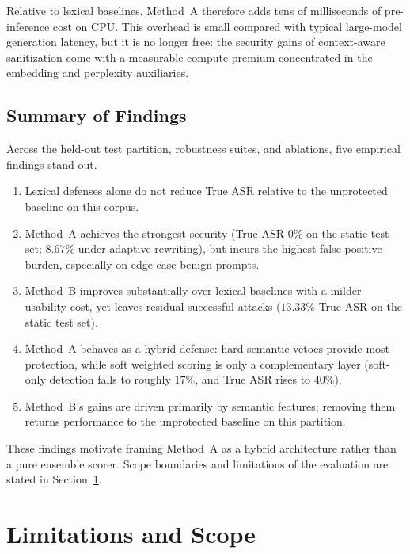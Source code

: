﻿\documentclass[10pt]{article}
\begin{document}
Relative to lexical baselines, Method~A therefore adds tens of milliseconds of pre-inference cost on CPU.
This overhead is small compared with typical large-model generation latency, but it is no longer free: the security gains of context-aware sanitization come with a measurable compute premium concentrated in the embedding and perplexity auxiliaries.

\subsection{Summary of Findings}
\label{sec:results-summary}

Across the held-out test partition, robustness suites, and ablations, five empirical findings stand out.
\begin{enumerate}
  \item Lexical defenses alone do not reduce True ASR relative to the unprotected baseline on this corpus.
  \item Method~A achieves the strongest security (True ASR \(0\%\) on the static test set; \(8.67\%\) under adaptive rewriting), but incurs the highest false-positive burden, especially on edge-case benign prompts.
  \item Method~B improves substantially over lexical baselines with a milder usability cost, yet leaves residual successful attacks (\(13.33\%\) True ASR on the static test set).
  \item Method~A behaves as a hybrid defense: hard semantic vetoes provide most protection, while soft weighted scoring is only a complementary layer (soft-only detection falls to roughly \(17\%\), and True ASR rises to \(40\%\)).
  \item Method~B's gains are driven primarily by semantic features; removing them returns performance to the unprotected baseline on this partition.
\end{enumerate}
These findings motivate framing Method~A as a hybrid architecture rather than a pure ensemble scorer.
Scope boundaries and limitations of the evaluation are stated in Section~\ref{sec:limitations}.



\section{Limitations and Scope}
\label{sec:limitations}
\end{document}
